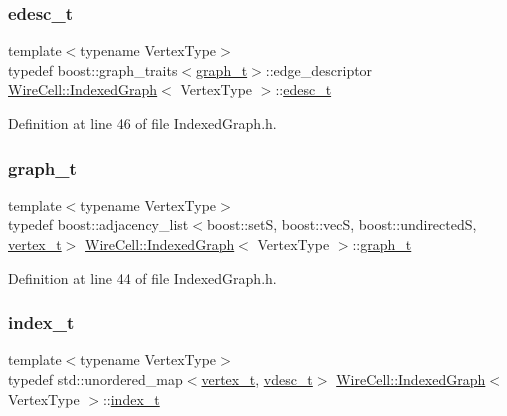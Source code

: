 \subsubsection{\texorpdfstring{edesc\+\_\+t}{edesc\_t}}
{\footnotesize\ttfamily template$<$typename Vertex\+Type$>$ \\
typedef boost\+::graph\+\_\+traits$<$\hyperlink{class_wire_cell_1_1_indexed_graph_a5593f08e4be84de33ebf37de7d071819}{graph\+\_\+t}$>$\+::edge\+\_\+descriptor \hyperlink{class_wire_cell_1_1_indexed_graph}{Wire\+Cell\+::\+Indexed\+Graph}$<$ Vertex\+Type $>$\+::\hyperlink{class_wire_cell_1_1_indexed_graph_a7dabdef2dec280294d6ead6f0fdc66c8}{edesc\+\_\+t}}



Definition at line 46 of file Indexed\+Graph.\+h.

\mbox{\label{class_wire_cell_1_1_indexed_graph_a5593f08e4be84de33ebf37de7d071819}} 
\subsubsection{\texorpdfstring{graph\+\_\+t}{graph\_t}}
{\footnotesize\ttfamily template$<$typename Vertex\+Type$>$ \\
typedef boost\+::adjacency\+\_\+list$<$boost\+::setS, boost\+::vecS, boost\+::undirectedS, \hyperlink{class_wire_cell_1_1_indexed_graph_ac26b25ac103373dde929a982d948d1b5}{vertex\+\_\+t}$>$ \hyperlink{class_wire_cell_1_1_indexed_graph}{Wire\+Cell\+::\+Indexed\+Graph}$<$ Vertex\+Type $>$\+::\hyperlink{class_wire_cell_1_1_indexed_graph_a5593f08e4be84de33ebf37de7d071819}{graph\+\_\+t}}



Definition at line 44 of file Indexed\+Graph.\+h.

\mbox{\label{class_wire_cell_1_1_indexed_graph_aae3465237209e244b48b594b6284526e}} 
\subsubsection{\texorpdfstring{index\+\_\+t}{index\_t}}
{\footnotesize\ttfamily template$<$typename Vertex\+Type$>$ \\
typedef std\+::unordered\+\_\+map$<$\hyperlink{class_wire_cell_1_1_indexed_graph_ac26b25ac103373dde929a982d948d1b5}{vertex\+\_\+t}, \hyperlink{class_wire_cell_1_1_indexed_graph_a8bad4d4e6f2d8a8109e95757d502c9ba}{vdesc\+\_\+t}$>$ \hyperlink{class_wire_cell_1_1_indexed_graph}{Wire\+Cell\+::\+Indexed\+Graph}$<$ Vertex\+Type $>$\+::\hyperlink{class_wire_cell_1_1_indexed_graph_aae3465237209e244b48b594b6284526e}{index\+\_\+t}}



